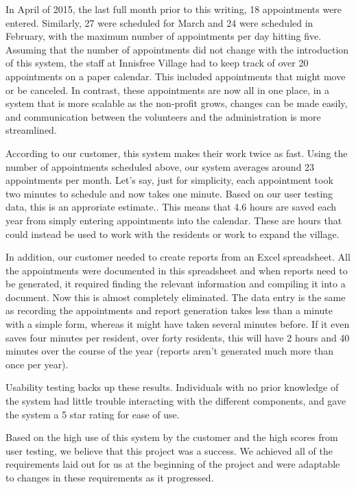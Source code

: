 \documentclass{sig-alternate}
\begin{document}
In April of 2015, the last full month prior to this writing, 18 appointments were entered. Similarly, 27 were scheduled for March and 24 were scheduled in February, with the maximum number of appointments per day hitting five. Assuming that the number of appointments did not change with the introduction of this system, the staff at Innisfree Village had to keep track of over 20 appointments on a paper calendar. This included appointments that might move or be canceled. In contrast, these appointments are now all in one place, in a system that is more scalable as the non-profit grows, changes can be made easily, and communication between the volunteers and the administration is more streamlined.

According to our customer, this system makes their work twice as fast. Using the number of appointments scheduled above, our system averages around 23 appointments per month. Let's say, just for simplicity, each appointment took two minutes to schedule and now takes one minute. Based on our user testing data, this is an approriate estimate.. This means that 4.6 hours are saved each year from simply entering appointments into the calendar. These are hours that could instead be used to work with the residents or work to expand the village.

In addition, our customer needed to create reports from an Excel spreadsheet. All the appointments were documented in this spreadsheet and when reports need to be generated, it required finding the relevant information and compiling it into a document. Now this is almost completely eliminated. The data entry is the same as recording the appointments and report generation takes less than a minute with a simple form, whereas it might have taken several minutes before. If it even saves four minutes per resident, over forty residents, this will have 2 hours and 40 minutes over the course of the year (reports aren't generated much more than once per year).

Usability testing backs up these results. Individuals with no prior knowledge of the system had little trouble interacting with the different components, and gave the system a 5 star rating for ease of use.

Based on the high use of this system by the customer and the high scores from user testing, we believe that this project was a success. We achieved all of the requirements laid out for us at the beginning of the project and were adaptable to changes in these requirements as it progressed.
\end{document}
